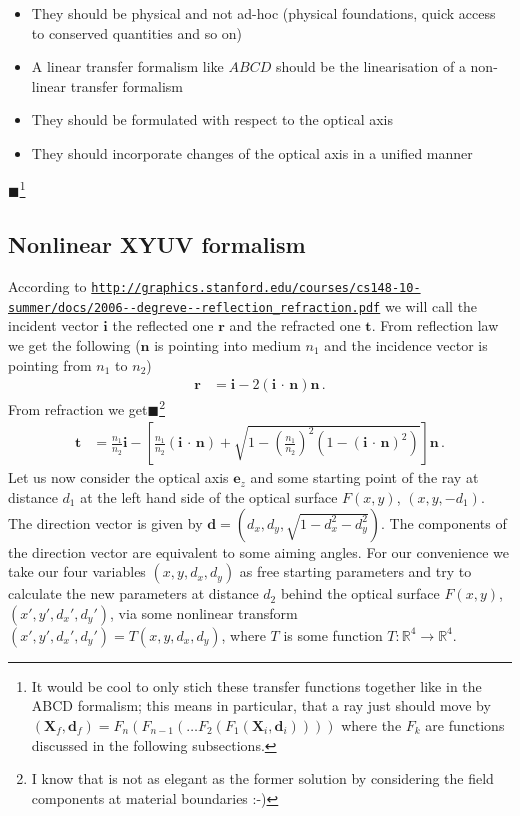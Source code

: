 \documentclass[12pt,a4paper,twoside,openright,BCOR10mm,headsepline,titlepage,abstracton,chapterprefix,final]{scrreprt}
\newcommand\Vector[1]{{\mathbf{#1}}}
\newcommand{\scpm}[2]{(#1\,\cdot\,#2)}
\newcommand{\remark}[1]{{\color{red}$\blacksquare$}\footnote{{\color{red}#1}}}
\begin{document}
\begin{itemize}
 \item They should be physical and not ad-hoc (physical foundations, quick access to conserved quantities and so on)
 \item A linear transfer formalism like $ABCD$ should be the linearisation of a non-linear transfer formalism
 \item They should be formulated with respect to the optical axis
 \item They should incorporate changes of the optical axis in a unified manner
\end{itemize}

\remark{It would be cool to only stich these transfer functions together like in the ABCD formalism;
this means in particular, that a ray just should move by $(\Vector{X}_f, \Vector{d}_f) = F_n (F_{n-1}( \dots F_2 (F_1(\Vector{X}_i, \Vector{d}_i))))$ where
the $F_k$ are functions discussed in the following subsections.}

\subsection{Nonlinear XYUV formalism}
According to {{\tt \url{http://graphics.stanford.edu/courses/cs148-10-summer/docs/2006--degreve--reflection_refraction.pdf}}}
we will call the incident vector $\Vector{i}$ the reflected one $\Vector{r}$ and the refracted one $\Vector{t}$.
From reflection law we get the following ($\Vector{n}$ is pointing into medium $n_1$ and the incidence vector is pointing from $n_1$ to $n_2$)
\begin{align}
 \Vector{r} &= \Vector{i} - 2 \scpm{\Vector{i}}{\Vector{n}} \Vector{n}\,.\label{eq:reflection_vector}
\end{align}
From refraction we get\remark{I know that is not as elegant as the former 
solution by considering the field components at material boundaries :-)}
\begin{align}
 \Vector{t} &= \frac{n_1}{n_2} \Vector{i} 
 - \left[\frac{n_1}{n_2} \scpm{\Vector{i}}{\Vector{n}} 
      + \sqrt{1 - \left(\frac{n_1}{n_2}\right)^2 (1 - {\scpm{\Vector{i}}{\Vector{n}}}^2)}\right] \Vector{n}\,.\label{eq:refraction_vector}
\end{align}
Let us now consider the optical axis $\Vector{e}_z$ and some starting point of the ray at distance $d_1$ at the left hand side
of the optical surface $F(x, y)$, $(x,y,-d_1)$. The direction vector is given by $\Vector{d} = (d_x, d_y, \sqrt{1 - d_x^2 - d_y^2})$.
The components of the direction vector are equivalent to some aiming angles. For our convenience we take our
four variables $(x, y, d_x, d_y)$ as free starting parameters and try to calculate the new parameters at distance $d_2$ behind the
optical surface $F(x, y)$, $(x', y', {d_x}', {d_y}')$, via some nonlinear transform $(x', y', {d_x}', {d_y}') = T(x, y, d_x, d_y)$,
where $T$ is some function $T:\mathbb{R}^4 \to \mathbb{R}^4$.
\end{document}
